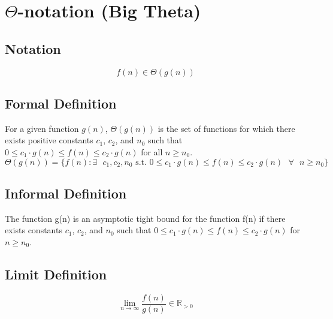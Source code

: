 \section{$\Theta$-notation (Big Theta)}

\subsection*{Notation}
$$
f(n) \in \Theta(g(n))
$$

\subsection*{Formal Definition}
For a given function $g(n)$, $\Theta(g(n))$ is the set of functions for which there exists positive constants $c_1$, $c_2$, and $n_0$ such that $0 \leq c_1 \cdot g(n) \leq f(n) \leq c_2 \cdot g(n)$ for all $n \geq n_0$.
$$
\Theta(g(n)) = \{ f(n) : \exists \text{ } c_1, c_2, n_0 \text{ s.t. } 0 \leq c_1 \cdot g(n) \leq f(n) \leq c_2 \cdot g(n) \text{ } \forall \text{ } n \geq n_0 \}
$$

\subsection*{Informal Definition}
The function g(n) is an asymptotic tight bound for the function f(n) if there exists constants $c_1$, $c_2$, and $n_0$ such that $0 \leq c_1 \cdot g(n) \leq f(n) \leq c_2 \cdot g(n)$ for $n \geq n_0$.

\subsection*{Limit Definition}
$$
\lim\limits_{n\to\infty} \frac{f(n)}{g(n)} \in \mathbb{R}_{>0}
$$